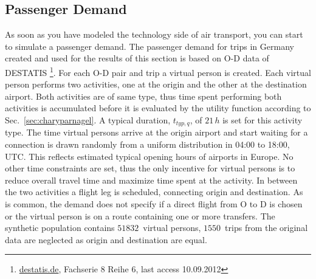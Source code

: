\subsection{Passenger Demand}


As soon as you have modeled the technology side of air transport, you can start to simulate a passenger demand. 
The passenger demand for trips in Germany created and used for the results of this section is based on O-D data of DESTATIS 
\footnote{\url{destatis.de}, Fachserie 8 Reihe 6, last access 10.09.2012}. 
For each O-D pair and trip a virtual person is created.
Each virtual person performs two activities, one at the origin and the other at the destination airport. 
Both activities are of same type, thus time spent performing both activities is accumulated before it is evaluated by the utility function according to Sec.~\ref{sec:charyparnagel}. %
A typical duration, $t_{typ,q}$, of $21 \, h$ is set for this activity type. 
The time virtual persons arrive at the origin airport and start waiting for a connection is drawn randomly from a uniform distribution in 04:00 to 18:00, UTC. 
This reflects estimated typical opening hours of airports in Europe.
No other time constraints are set, thus the only incentive for virtual persons is to reduce overall travel time and maximize time spent at the activity. 
In between the two activities a flight leg is scheduled, connecting origin and destination.
As is common, the demand does not specify if a direct flight from O to D is chosen or the virtual person is on a route containing one or more transfers.
The synthetic population contains $51832$~virtual persons, $1550$~trips from the original data are neglected as origin and destination are equal. 
%

